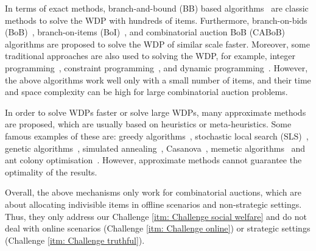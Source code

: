 \documentclass[11pt]{phdthesis}
\begin{document}
In terms of exact methods, branch-and-bound (BB) based algorithms~\citep{sandholm2002winner,sandholm2002algorithm} are classic methods to solve the WDP with hundreds of items. Furthermore, branch-on-bids (BoB)~\citep{sandholm2003bob}, branch-on-items (BoI)~\citep{sandholm2000improved}, and combinatorial auction BoB (CABoB)~\citep{sandholm2005cabob} algorithms are proposed to solve the WDP of similar scale faster.
Moreover, some traditional approaches are also used to solving the WDP, for example, integer programming~\citep{andersson2000integer}, constraint programming~\citep{porter1999effect}, and dynamic programming~\citep{rothkopf1998computationally}. However, the above algorithms work well only with a small number of items, and their time and space complexity can be high for large combinatorial auction problems.

In order to solve WDPs faster or solve large WDPs, many approximate methods are proposed, which are usually based on heuristics or meta-heuristics. Some famous examples of these are: greedy algorithms~\citep{krysta2005greedy}, stochastic local search (SLS)~\citep{boughaci2010local}, genetic algorithms~\citep{boughaci2009memetic}, simulated annealing~\citep{guo2006heuristics}, Casanova~\citep{hoos2000solving}, memetic algorithms~\citep{boughaci2009memetic} and ant colony optimisation~\citep{ray2018ant}. 
However, approximate methods cannot guarantee the optimality of the results.

Overall, the above mechanisms only work for combinatorial auctions, which are about allocating indivisible items in offline scenarios and non-strategic settings. Thus, they only address our Challenge \ref{itm: Challenge social welfare} and do not deal with online scenarios (Challenge \ref{itm: Challenge online}) or strategic settings (Challenge \ref{itm: Challenge truthful}).
\end{document}
